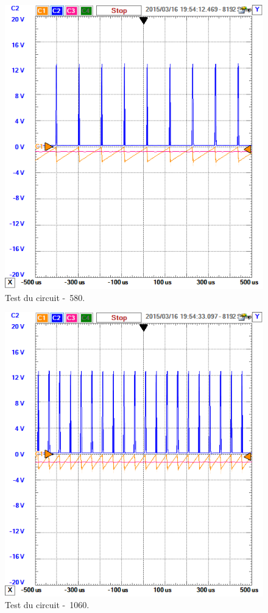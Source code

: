 \begin{figure}[ht]
	\centering
	\includegraphics[scale=0.7]{img/circuit-test-580mv.png}
	\caption{Test du circuit \unit{-580}{\milli\volt}.}
	\label{fig:test-580}
\end{figure}

\begin{figure}[ht]
	\centering
	\includegraphics[scale=0.7]{img/circuit-test-1060mv.png}
	\caption{Test du circuit \unit{-1060}{\milli\volt}.}
	\label{fig:test-1060}
\end{figure}

